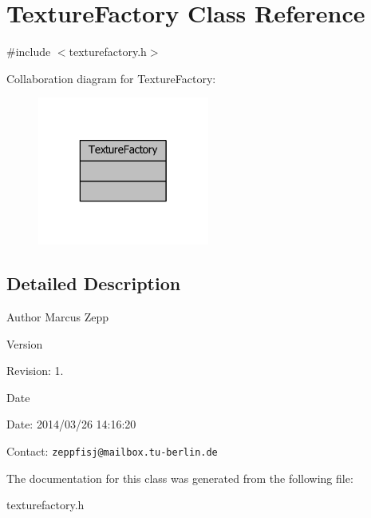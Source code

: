 \section{Texture\-Factory Class Reference}
\label{classTextureFactory}


{\ttfamily \#include $<$texturefactory.\-h$>$}



Collaboration diagram for Texture\-Factory\-:
\nopagebreak
\begin{figure}[H]
\begin{center}
\leavevmode
\includegraphics[width=160pt]{d0/dbe/classTextureFactory__coll__graph}
\end{center}
\end{figure}


\subsection{Detailed Description}
\begin{DoxyAuthor}{Author}
Marcus Zepp
\end{DoxyAuthor}
\begin{DoxyVersion}{Version}

\end{DoxyVersion}
\begin{DoxyParagraph}{Revision\-:}
1. 
\end{DoxyParagraph}


\begin{DoxyDate}{Date}

\end{DoxyDate}
\begin{DoxyParagraph}{Date\-:}
2014/03/26 14\-:16\-:20 
\end{DoxyParagraph}


Contact\-: {\tt zeppfisj@mailbox.\-tu-\/berlin.\-de} 

The documentation for this class was generated from the following file\-:\begin{DoxyCompactItemize}
\item 
texturefactory.\-h\end{DoxyCompactItemize}

